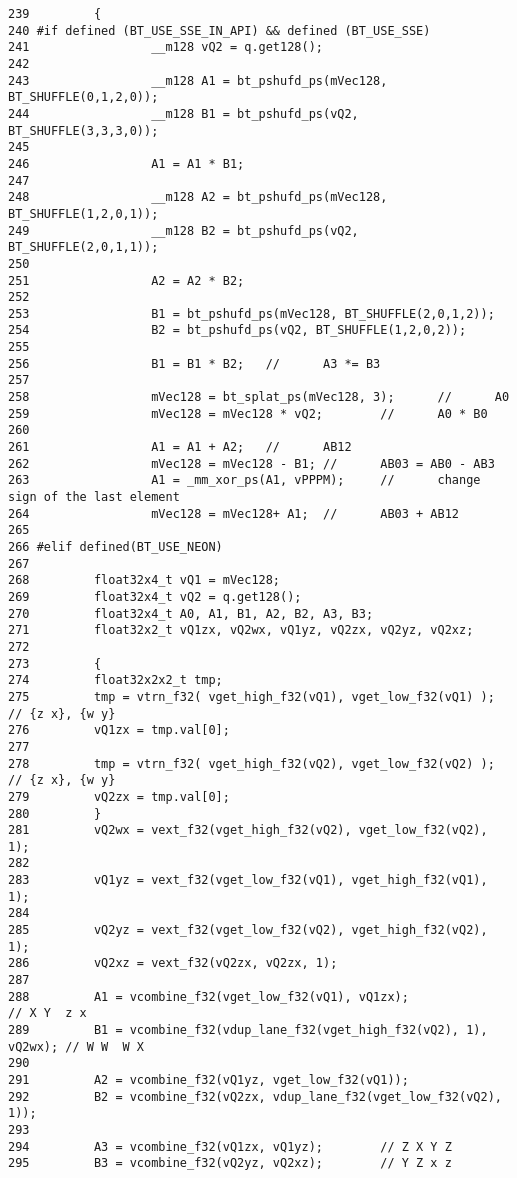 \begin{Code}\begin{verbatim}239         {
240 #if defined (BT_USE_SSE_IN_API) && defined (BT_USE_SSE)
241                 __m128 vQ2 = q.get128();
242                 
243                 __m128 A1 = bt_pshufd_ps(mVec128, BT_SHUFFLE(0,1,2,0));
244                 __m128 B1 = bt_pshufd_ps(vQ2, BT_SHUFFLE(3,3,3,0));
245                 
246                 A1 = A1 * B1;
247                 
248                 __m128 A2 = bt_pshufd_ps(mVec128, BT_SHUFFLE(1,2,0,1));
249                 __m128 B2 = bt_pshufd_ps(vQ2, BT_SHUFFLE(2,0,1,1));
250                 
251                 A2 = A2 * B2;
252                 
253                 B1 = bt_pshufd_ps(mVec128, BT_SHUFFLE(2,0,1,2));
254                 B2 = bt_pshufd_ps(vQ2, BT_SHUFFLE(1,2,0,2));
255                 
256                 B1 = B1 * B2;   //      A3 *= B3
257                 
258                 mVec128 = bt_splat_ps(mVec128, 3);      //      A0
259                 mVec128 = mVec128 * vQ2;        //      A0 * B0
260                 
261                 A1 = A1 + A2;   //      AB12
262                 mVec128 = mVec128 - B1; //      AB03 = AB0 - AB3 
263                 A1 = _mm_xor_ps(A1, vPPPM);     //      change sign of the last element
264                 mVec128 = mVec128+ A1;  //      AB03 + AB12
265 
266 #elif defined(BT_USE_NEON)     
267 
268         float32x4_t vQ1 = mVec128;
269         float32x4_t vQ2 = q.get128();
270         float32x4_t A0, A1, B1, A2, B2, A3, B3;
271         float32x2_t vQ1zx, vQ2wx, vQ1yz, vQ2zx, vQ2yz, vQ2xz;
272         
273         {
274         float32x2x2_t tmp;
275         tmp = vtrn_f32( vget_high_f32(vQ1), vget_low_f32(vQ1) );       // {z x}, {w y}
276         vQ1zx = tmp.val[0];
277 
278         tmp = vtrn_f32( vget_high_f32(vQ2), vget_low_f32(vQ2) );       // {z x}, {w y}
279         vQ2zx = tmp.val[0];
280         }
281         vQ2wx = vext_f32(vget_high_f32(vQ2), vget_low_f32(vQ2), 1); 
282 
283         vQ1yz = vext_f32(vget_low_f32(vQ1), vget_high_f32(vQ1), 1);
284 
285         vQ2yz = vext_f32(vget_low_f32(vQ2), vget_high_f32(vQ2), 1);
286         vQ2xz = vext_f32(vQ2zx, vQ2zx, 1);
287 
288         A1 = vcombine_f32(vget_low_f32(vQ1), vQ1zx);                    // X Y  z x 
289         B1 = vcombine_f32(vdup_lane_f32(vget_high_f32(vQ2), 1), vQ2wx); // W W  W X 
290 
291         A2 = vcombine_f32(vQ1yz, vget_low_f32(vQ1));
292         B2 = vcombine_f32(vQ2zx, vdup_lane_f32(vget_low_f32(vQ2), 1));
293 
294         A3 = vcombine_f32(vQ1zx, vQ1yz);        // Z X Y Z
295         B3 = vcombine_f32(vQ2yz, vQ2xz);        // Y Z x z

\end{verbatim}
\end{Code}
